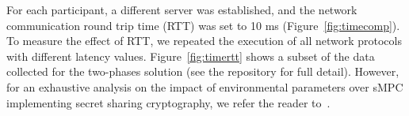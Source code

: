 For each participant, a different server was established, and the network communication round trip time (RTT) was set to 10 ms (Figure~\ref{fig:timecomp}). 
To measure the effect of RTT, we repeated the execution of all network protocols with different latency values.
Figure~\ref{fig:timertt} shows a subset of the data collected for the two-phases solution (see the repository for full detail).   
However, for an exhaustive analysis on the impact of environmental parameters over sMPC implementing secret sharing cryptography, we refer the reader to~\cite{DBLP:journals/corr/abs-1804-03548}.












